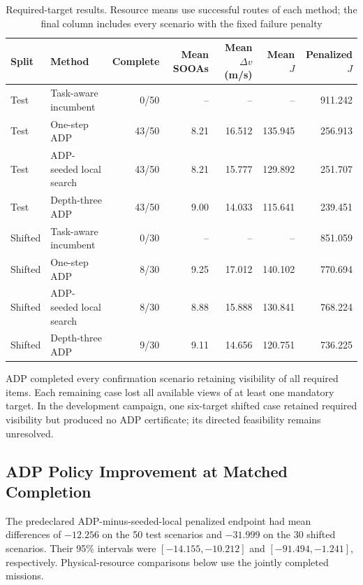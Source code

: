 \documentclass{IEEEtaes}
\theoremstyle{remark}
\theoremstyle{plain}
\begin{document}
\begin{table}[t]
  \centering
  \caption{Required-target results. Resource means use successful routes of each method; the final column includes every scenario with the fixed failure penalty}
  \label{tab:paired-aggregate}
  \renewcommand{\arraystretch}{1.08}
  \setlength{\tabcolsep}{5pt}
  \footnotesize
  \begin{tabular*}{\linewidth}{@{\extracolsep{\fill}}llrrrrr@{}}
    \toprule
    Split & Method & Complete & Mean SOOAs & Mean $\Delta v$ (m/s) & Mean $J$ & Penalized $J$ \\
    \midrule
    Test & Task-aware incumbent & 0/50 & -- & -- & -- & 911.242 \\
    Test & One-step ADP & 43/50 & 8.21 & 16.512 & 135.945 & 256.913 \\
    Test & ADP-seeded local search & 43/50 & 8.21 & 15.777 & 129.892 & 251.707 \\
    Test & Depth-three ADP & 43/50 & 9.00 & 14.033 & 115.641 & 239.451 \\
    Shifted & Task-aware incumbent & 0/30 & -- & -- & -- & 851.059 \\
    Shifted & One-step ADP & 8/30 & 9.25 & 17.012 & 140.102 & 770.694 \\
    Shifted & ADP-seeded local search & 8/30 & 8.88 & 15.888 & 130.841 & 768.224 \\
    Shifted & Depth-three ADP & 9/30 & 9.11 & 14.656 & 120.751 & 736.225 \\
    \bottomrule
  \end{tabular*}
\end{table}

ADP completed every confirmation scenario retaining visibility of all required items. Each remaining case lost all available views of at least one mandatory target. In the development campaign, one six-target shifted case retained required visibility but produced no ADP certificate; its directed feasibility remains unresolved.

\subsection{ADP Policy Improvement at Matched Completion}

The predeclared ADP-minus-seeded-local penalized endpoint had mean differences of $-12.256$ on the 50 test scenarios and $-31.999$ on the 30 shifted scenarios. Their 95\% intervals were $[-14.155,-10.212]$ and $[-91.494,-1.241]$, respectively. Physical-resource comparisons below use the jointly completed missions.
\end{document}
